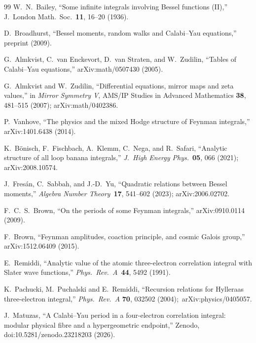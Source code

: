 \documentclass[aps,pra,twocolumn,superscriptaddress,longbibliography]{revtex4-2}
\begin{document}
\begin{thebibliography}{99}
W.~N.~Bailey, ``Some infinite integrals involving Bessel functions (II),''
J.\ London Math.\ Soc.\ \textbf{11}, 16--20 (1936).

D.~Broadhurst, ``Bessel moments, random walks and Calabi--Yau equations,''
preprint (2009).

G.~Almkvist, C.~van Enckevort, D.~van Straten, and W.~Zudilin, ``Tables of
Calabi--Yau equations,'' arXiv:math/0507430 (2005).

G.~Almkvist and W.~Zudilin, ``Differential equations, mirror maps and zeta
values,'' in \textit{Mirror Symmetry V}, AMS/IP Studies in Advanced
Mathematics \textbf{38}, 481--515 (2007); arXiv:math/0402386.

P.~Vanhove, ``The physics and the mixed Hodge structure of Feynman
integrals,'' arXiv:1401.6438 (2014).

K.~B\"onisch, F.~Fischbach, A.~Klemm, C.~Nega, and R.~Safari, ``Analytic
structure of all loop banana integrals,'' \textit{J.\ High Energy Phys.}\
\textbf{05}, 066 (2021); arXiv:2008.10574.

J.~Fres\'an, C.~Sabbah, and J.-D.~Yu, ``Quadratic relations between Bessel
moments,'' \textit{Algebra Number Theory}\ \textbf{17}, 541--602 (2023);
arXiv:2006.02702.

F.~C.~S.~Brown, ``On the periods of some Feynman integrals,'' arXiv:0910.0114 (2009).

F.~Brown, ``Feynman amplitudes, coaction principle, and cosmic Galois
group,'' arXiv:1512.06409 (2015).

E.~Remiddi, ``Analytic value of the atomic three-electron correlation
integral with Slater wave functions,'' \textit{Phys.\ Rev.\ A}\ \textbf{44},
5492 (1991).

K.~Pachucki, M.~Puchalski and E.~Remiddi, ``Recursion relations for
Hylleraas three-electron integral,'' \textit{Phys.\ Rev.\ A} \textbf{70},
032502 (2004);\ arXiv:physics/0405057.

J.~Matuzas, ``A Calabi--Yau period in a four-electron correlation integral:
modular physical fibre and a hypergeometric endpoint,'' Zenodo,
doi:10.5281/zenodo.23218203 (2026).

\end{thebibliography}
\end{document}

